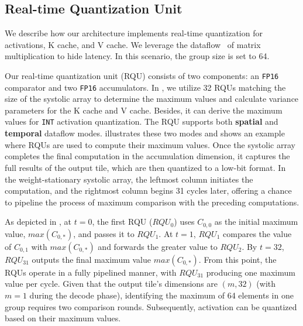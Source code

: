 \subsection{Real-time Quantization Unit}
\label{sec:real_time_engine}
We describe how our architecture implements real-time quantization for activations, K cache, and V cache. 
We leverage the dataflow~\cite{guo2020balancing,jouppi2023tpu,zhou2021characterizing,chen2016eyeriss,VELTAIR,zhou2023ugrapher} of matrix multiplication to hide latency.
In this scenario, the group size is set to 64.



Our real-time quantization unit (RQU) consists of two components: an \texttt{FP16} comparator and two \texttt{FP16} accumulators.
In \proj, we utilize 32 RQUs matching the size of the systolic array to determine the maximum values and calculate variance parameters for the K cache and V cache.
Besides, it can derive the maximum values for \texttt{INT} activation quantization.
The RQU supports both \textbf{spatial} and \textbf{temporal} dataflow modes. 
 illustrates these two modes and shows an example where RQUs are used to compute their maximum values.
Once the systolic array completes the final computation in the accumulation dimension, it captures the full results of the output tile, which are then quantized to a low-bit format. 
In the weight-stationary systolic array, the leftmost column initiates the computation, and the rightmost column begins 31 cycles later, offering a chance to pipeline the process of maximum comparison with the preceding computations.


As depicted in , at $t=0$, the first RQU ($RQU_0$) uses $C_{0, 0}$ as the initial maximum value, $max(C_{0, *})$, and passes it to $RQU_1$. 
At $t=1$, $RQU_1$ compares the value of $C_{0, 1}$ with $max(C_{0, *})$ and forwards the greater value to $RQU_2$. By $t=32$, $RQU_{31}$ outputs the final maximum value $max(C_{0, *})$. 
From this point, the RQUs operate in a fully pipelined manner, with $RQU_{31}$ producing one maximum value per cycle. Given that the output tile's dimensions are $(m, 32)$ (with $m=1$ during the decode phase), identifying the maximum of 64 elements in one group requires two comparison rounds. 
Subsequently, activation can be quantized based on their maximum values.


